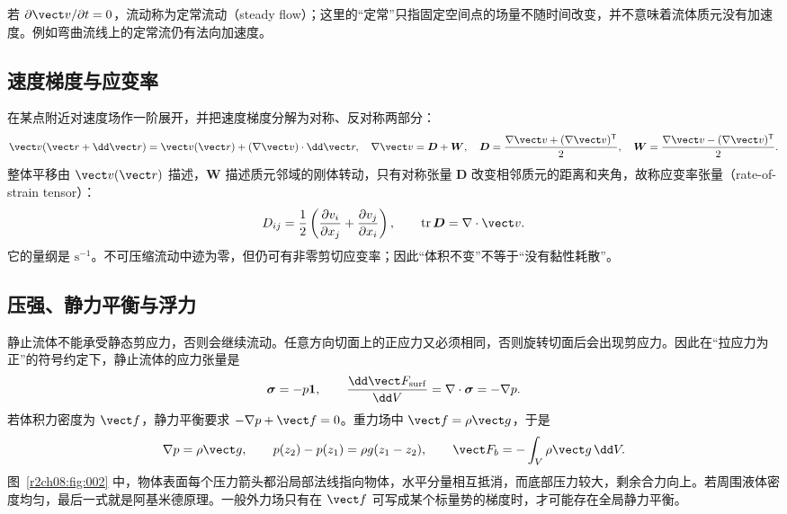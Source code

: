 若 $\partial\vect v/\partial t=0$，流动称为定常流动（steady flow）；这里的“定常”只指固定空间点的场量不随时间改变，并不意味着流体质元没有加速度。例如弯曲流线上的定常流仍有法向加速度。

\subsection{速度梯度与应变率}
\label{r2ch08:subsec:deformation}

在某点附近对速度场作一阶展开，并把速度梯度分解为对称、反对称两部分：
\begin{equation}
 \vect v(\vect r+\dd\vect r)=\vect v(\vect r)+(\nabla\vect v)\cdot\dd\vect r,
 \quad \nabla\vect v=\boldsymbol D+\boldsymbol W,
 \quad \boldsymbol D=\frac{\nabla\vect v+(\nabla\vect v)^{\mathsf T}}2,
 \quad \boldsymbol W=\frac{\nabla\vect v-(\nabla\vect v)^{\mathsf T}}2.
 \label{r2ch08:eq:005}
\end{equation}
整体平移由 $\vect v(\vect r)$ 描述，$\boldsymbol W$ 描述质元邻域的刚体转动，只有对称张量 $\boldsymbol D$ 改变相邻质元的距离和夹角，故称应变率张量（rate-of-strain tensor）：
\begin{equation}
 D_{ij}=\frac12\left(\frac{\partial v_i}{\partial x_j}+\frac{\partial v_j}{\partial x_i}\right),
 \qquad \operatorname{tr}\boldsymbol D=\nabla\cdot\vect v.
 \label{r2ch08:eq:006}
\end{equation}
它的量纲是 $\mathrm{s^{-1}}$。不可压缩流动中迹为零，但仍可有非零剪切应变率；因此“体积不变”不等于“没有黏性耗散”。

\subsection{压强、静力平衡与浮力}
\label{r2ch08:subsec:hydrostatic}

静止流体不能承受静态剪应力，否则会继续流动。任意方向切面上的正应力又必须相同，否则旋转切面后会出现剪应力。因此在“拉应力为正”的符号约定下，静止流体的应力张量是
\begin{equation}
 \boldsymbol\sigma=-p\boldsymbol 1,
 \qquad
 \frac{\dd\vect F_{\rm surf}}{\dd V}=\nabla\cdot\boldsymbol\sigma=-\nabla p.
 \label{r2ch08:eq:007}
\end{equation}
若体积力密度为 $\vect f$，静力平衡要求 $-\nabla p+\vect f=0$。重力场中 $\vect f=\rho\vect g$，于是
\begin{equation}
 \nabla p=\rho\vect g,
 \qquad p(z_2)-p(z_1)=\rho g(z_1-z_2),
 \qquad \vect F_b=-\int_V\rho\vect g\,\dd V.
 \label{r2ch08:eq:008}
\end{equation}
图~\ref{r2ch08:fig:002} 中，物体表面每个压力箭头都沿局部法线指向物体，水平分量相互抵消，而底部压力较大，剩余合力向上。若周围液体密度均匀，最后一式就是阿基米德原理。一般外力场只有在 $\vect f$ 可写成某个标量势的梯度时，才可能存在全局静力平衡。
\figHydrostatic

